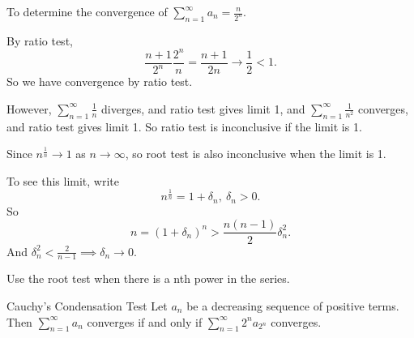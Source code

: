 \begin{example}
    To determine the convergence of \(\sum\limits_{n=1}^{\infty} a_n = \frac{n}{2^n}\).

    By ratio test,
    \[
        \frac{n + 1}{2^n}\frac{2^n}{n} = \frac{n + 1}{2n}\to \frac{1}{2}<1.
    \]
    So we have convergence by ratio test.

    However, \(\sum\limits_{n=1}^{\infty} \frac{1}{n}\) diverges, and ratio test gives limit 1, and \(\sum\limits_{n=1}^{\infty} \frac{1}{n^2}\) converges, and ratio test gives limit 1. So ratio test is inconclusive if the limit is 1.

    Since \(n^{\frac{1}{n}} \to 1\) as \(n \to \infty\), so root test is also inconclusive when the limit is 1.

    To see this limit, write
    \[
        n^{\frac{1}{n}} = 1 + \delta_n, ~\delta_n > 0.
    \]
    So
    \[
        n = (1 + \delta_n)^n > \frac{n(n-1)}{2}\delta_n^2.
    \]
    And \(\delta_n^2 < \frac{2}{n - 1}\implies \delta_n \to 0\).
\end{example}
\begin{remark}
    Use the root test when there is a nth power in the series.
\end{remark}
\begin{theorem}{Cauchy's Condensation Test}{}
    Let \(a_n\) be a decreasing sequence of positive terms. Then \(\sum\limits_{n=1}^{\infty} a_n\) converges if and only if \(\sum\limits_{n=1}^{\infty} 2^n a_{2^n}\) converges.
\end{theorem}
